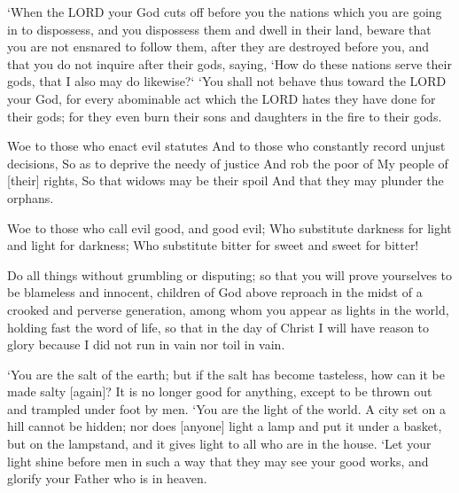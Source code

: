 \begin{scripture}[Deuteronomy 12:29-31]
    `When the LORD your God cuts off before you the nations which you are going in to dispossess, and you dispossess them and dwell in their land,
    beware that you are not ensnared to follow them, after they are destroyed before you, and that you do not inquire after their gods, saying, `How do these nations serve their gods, that I also may do likewise?`
    `You shall not behave thus toward the LORD your God, for every abominable act which the LORD hates they have done for their gods; for they even burn their sons and daughters in the fire to their gods.
\end{scripture}

\begin{scripture}[Isaiah 10:1-2]
    Woe to those who enact evil statutes And to those who constantly record unjust decisions,
    So as to deprive the needy of justice And rob the poor of My people of [their] rights, So that widows may be their spoil And that they may plunder the orphans.
\end{scripture}

\begin{scripture}[Isaiah 5:20]
    Woe to those who call evil good, and good evil; Who substitute darkness for light and light for darkness; Who substitute bitter for sweet and sweet for bitter!
\end{scripture}

\begin{scripture}[Philippians 2:14-16]
    Do all things without grumbling or disputing;
    so that you will prove yourselves to be blameless and innocent, children of God above reproach in the midst of a crooked and perverse generation, among whom you appear as lights in the world,
    holding fast the word of life, so that in the day of Christ I will have reason to glory because I did not run in vain nor toil in vain.
\end{scripture}

\begin{scripture}[Matthew 5:13-16]
    `You are the salt of the earth; but if the salt has become tasteless, how can it be made salty [again]? It is no longer good for anything, except to be thrown out and trampled under foot by men.
    `You are the light of the world. A city set on a hill cannot be hidden;
    nor does [anyone] light a lamp and put it under a basket, but on the lampstand, and it gives light to all who are in the house.
    `Let your light shine before men in such a way that they may see your good works, and glorify your Father who is in heaven.
\end{scripture}

